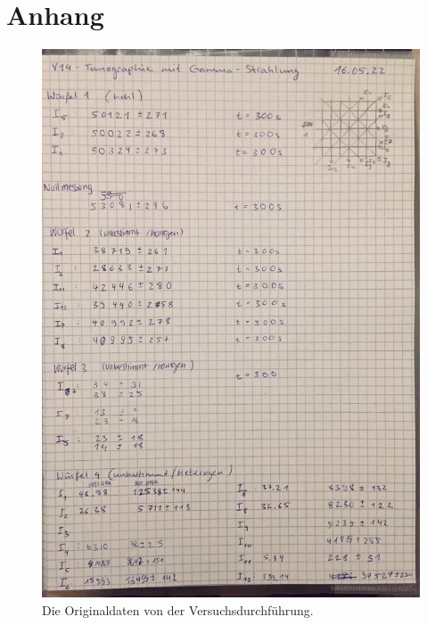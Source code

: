 \section{Anhang}
\label{sec:anhang}

\begin{figure}
    \centering
    \includegraphics[width=\textwidth]{bilder/Originaldaten.jpeg}
    \caption{Die Originaldaten von der Versuchsdurchführung.}
    \label{fig:originaldaten}
\end{figure}